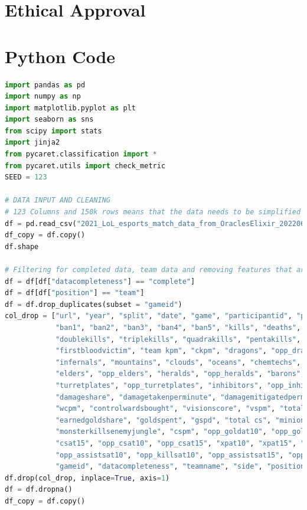
\chapter{Ethical Approval}\label{ch:Ethical Approval}



\chapter{Python Code}\label{ch:Python Code}

\begin{lstlisting}[language=python,label={lst:pythoncode}]
import pandas as pd
import numpy as np
import matplotlib.pyplot as plt
import seaborn as sns
from scipy import stats
import jinja2
from pycaret.classification import *
from pycaret.utils import check_metric
SEED = 123

# DATA INPUT AND CLEANING
# 123 Columns and 150k rows means that the data needs to be simplified and the non-essentials be stripped.
df = pd.read_csv("2021_LoL_esports_match_data_from_OraclesElixir_20220606.csv")
df_copy = df.copy()
df.shape

# Filtering for completed data, team data and removing features that are non-team related or deemed useless for our model
df = df[df["datacompleteness"] == "complete"]
df = df[df["position"] == "team"]
df = df.drop_duplicates(subset = "gameid")
col_drop = ["url", "year", "split", "date", "game", "participantid", "playername", "playerid", "teamid", "champion",
            "ban1", "ban2", "ban3", "ban4", "ban5", "kills", "deaths", "assists", "teamkills", "teamdeaths",
            "doublekills", "triplekills", "quadrakills", "pentakills", "firstbloodkill", "firstbloodassist",
            "firstbloodvictim", "team kpm", "ckpm", "dragons", "opp_dragons", "elementaldrakes", "opp_elementaldrakes",
            "infernals", "mountains", "clouds", "oceans", "chemtechs", "hextechs", "dragons (type unknown)",
            "elders", "opp_elders", "heralds", "opp_heralds", "barons", "opp_barons", "towers", "opp_towers",
            "turretplates", "opp_turretplates", "inhibitors", "opp_inhibitors", "damagetochampions", "dpm",
            "damageshare", "damagetakenperminute", "damagemitigatedperminute", "wardsplaced", "wpm", "wardskilled",
            "wcpm", "controlwardsbought", "visionscore", "vspm", "totalgold", "earnedgold", "earned gpm",
            "earnedgoldshare", "goldspent", "gspd", "total cs", "minionkills", "monsterkills", "monsterkillsownjungle",
            "monsterkillsenemyjungle", "cspm", "opp_goldat10", "opp_goldat15", "goldat10", "goldat15", "csat10",
            "csat15", "opp_csat10", "opp_csat15", "xpat10", "xpat15", "opp_xpat10", "opp_xpat15", "league",
            "opp_assistsat10", "opp_killsat10", "opp_assistsat15", "opp_killsat15", "opp_deathsat10", "opp_deathsat15",
            "gameid", "datacompleteness", "teamname", "side", "position",]
df.drop(col_drop, inplace=True, axis=1)
df = df.dropna()
df_copy = df.copy()


\end{lstlisting}
